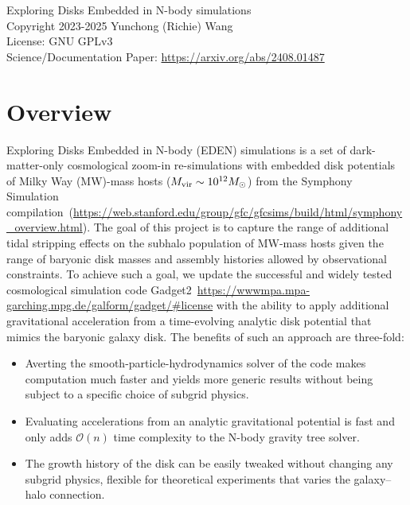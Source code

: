 \documentclass[12pt]{article}
\begin{document}
	\vspace{-1ex}
	\noindent{}Exploring Disks Embedded in N-body simulations \\
    \noindent{}Copyright \textcopyright{}2023-2025 Yunchong (Richie) Wang\\
    \noindent{}License: GNU GPLv3\\
	\noindent{}Science/Documentation Paper: \url{https://arxiv.org/abs/2408.01487}\\
	
	\tableofcontents
	\newcommand{\ttt}[1]{\texttt{#1}}
	
	\section{Overview}
	
	Exploring Disks Embedded in N-body (EDEN) simulations is a set of dark-matter-only cosmological zoom-in re-simulations with embedded disk potentials of Milky Way (MW)-mass hosts ($M_{\rm vir} \sim 10^{12}M_{\odot}$) from the Symphony Simulation compilation~(\url{https://web.stanford.edu/group/gfc/gfcsims/build/html/symphony_overview.html}). The goal of this project is to capture the range of additional tidal stripping effects on the subhalo population of MW-mass hosts given the range of baryonic disk masses and assembly histories allowed by observational constraints. To achieve such a goal, we update the successful and widely tested cosmological simulation code Gadget2~\url{https://wwwmpa.mpa-garching.mpg.de/galform/gadget/#license} with the ability to apply additional gravitational acceleration from a time-evolving analytic disk potential that mimics the baryonic galaxy disk. The benefits of such an approach are three-fold: 
    \begin{itemize}
        \item Averting the smooth-particle-hydrodynamics solver of the code makes computation much faster and yields more generic results without being subject to a specific choice of subgrid physics.
        \item Evaluating accelerations from an analytic gravitational potential is fast and only adds $\mathcal{O}(n)$ time complexity to the N-body gravity tree solver.
        \item The growth history of the disk can be easily tweaked without changing any subgrid physics, flexible for theoretical experiments that varies the galaxy--halo connection.
    \end{itemize}
    
\end{document}
